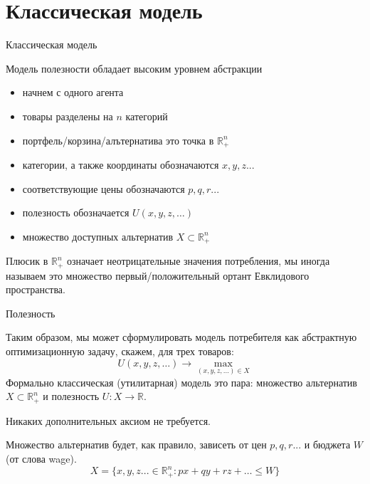 \documentclass{beamer}
\begin{document}
\section{Классическая модель}

\begin{frame}{Классическая модель}

Модель полезности обладает высоким уровнем абстракции

\begin{itemize}
\item начнем с одного агента
\item товары разделены на $n$ категорий
\item портфель/корзина/алътернатива это точка в $\mathbb{R}_{+}^{n}$	
\item категории, а также координаты обозначаются $x, y, z...$
\item соответствующие цены обозначаются $p, q, r...$
\item полезность обозначается $U(x,y,z, \ldots)$
\item множество доступных альтернатив $X \subset \mathbb{R}_{+}^{n}$
\end{itemize}


Плюсик в $\mathbb{R}_{+}^{n}$ означает неотрицательные значения потребления, мы иногда называем это множество \alert{первый/положительный ортант Евклидового пространства}.

\end{frame}

\begin{frame}{Полезность}

Таким образом, мы может сформулировать модель потребителя как абстрактную оптимизационную задачу, скажем, для трех товаров:
$$ U(x,y,z, \ldots) \to \max_{(x,y,z, \ldots) \in X}$$
Формально \alert{классическая  (утилитарная) модель} это пара: множество альтернатив $X \subset \mathbb{R}^n_{+}$ и полезность $U: X \to \mathbb{R}$.

Никаких дополнительных аксиом не требуется.

Множество альтернатив будет, как правило, зависеть от цен $p,q,r...$ и бюджета $W$ (от слова \alert{wage}).
$$ X = \{x,y,z... \in \mathbb{R}_{+}^{n}: p x + q y + r z + \ldots \leqslant W \}$$

\end{frame}
\end{document}
